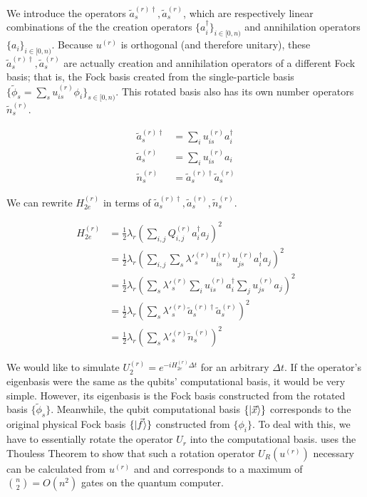 We introduce the operators $\tilde{a}^{(r)\dag}_s, \tilde{a}^{(r)}_s$, which are respectively linear combinations of the the creation operators $\{a^\dag_i\}_{i \in [0, n)}$ and annihilation operators $\{a_i\}_{i \in [0, n)}$. Because $u^{(r)}$ is orthogonal (and therefore unitary), these $\tilde{a}^{(r)\dag}_s, \tilde{a}^{(r)}_s$ are actually creation and annihilation operators of a different Fock basis; that is, the Fock basis created from the single-particle basis $\{\tilde{\phi}_s = \sum_s u^{(r)}_{is} \phi_i\}_{s \in [0, n)}$. This rotated basis also has its own number operators $\tilde{n}^{(r)}_s$.

\begin{equation}
    \begin{split}
        \tilde{a}^{(r)\dag}_s &= \sum_iu^{(r)}_{is}a^\dag_i \\
        \tilde{a}^{(r)}_s &= \sum_iu^{(r)}_{is}a_i \\
        \tilde{n}^{(r)}_s &= \tilde{a}^{(r)\dag}_s\tilde{a}^{(r)}_s
    \end{split}
\end{equation}

We can rewrite $H_{2e}^{(r)}$ in terms of $\tilde{a}^{(r)\dag}_s, \tilde{a}^{(r)}_s, \tilde{n}^{(r)}_s$.

\begin{equation}
    \begin{split}
        H_{2e}^{(r)} &= \frac{1}{2}\lambda_r\left(\sum_{i,j} Q^{(r)}_{i, j}a^\dag_ia_j\right)^2 \\
        &= \frac{1}{2}\lambda_r\left(\sum_{i,j} \sum_s \lambda'^{(r)}_s u^{(r)}_{is}u^{(r)}_{js}a^\dag_ia_j\right)^2 \\
        &= \frac{1}{2}\lambda_r\left(\sum_s \lambda'^{(r)}_s \sum_i u^{(r)}_{is}a^\dag_i\sum_ju^{(r)}_{js}a_j\right)^2 \\
        &= \frac{1}{2}\lambda_r\left(\sum_s \lambda'^{(r)}_s \tilde{a}^{(r)\dag}_s\tilde{a}^{(r)}_s\right)^2 \\
        &= \frac{1}{2}\lambda_r\left(\sum_s \lambda'^{(r)}_s \tilde{n}^{(r)}_s\right)^2
    \end{split}
\end{equation}

We would like to simulate $U_2^{(r)} = e^{-iH_{2e}^{(r)}\Delta t}$ for an arbitrary $\Delta t$. If the operator's eigenbasis were the same as the qubits' computational basis, it would be very simple. However, its eigenbasis is the Fock basis constructed from the rotated basis $\{\tilde{\phi}_s\}$. Meanwhile, the qubit computational basis $\{\ket{\vec{x}}\}$ corresponds to the original physical Fock basis $\{\ket{\vec{f}}\}$ constructed from $\{\phi_i\}$. To deal with this, we have to essentially rotate the operator $U_r$ into the computational basis. \cite{FSN} uses the Thouless Theorem to show that such a rotation operator $U_R(u^{(r)})$ necessary can be calculated from $u^{(r)}$ and and corresponds to a maximum of ${n \choose 2} = O(n^2)$ gates on the quantum computer. 

